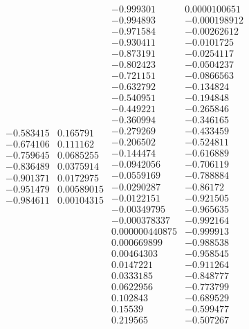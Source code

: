 \documentclass{watsonbook}
\begin{document}
\begin{aexercise}
{$$\begin{array}{cc}
      -0.583415 & 0.165791 \\
      -0.674106 & 0.111162 \\
      -0.759645 & 0.0685255 \\
      -0.836489 & 0.0375914 \\
      -0.901371 & 0.0172975 \\
      -0.951479 & 0.00589015 \\
      -0.984611 & 0.00104315 
    \end{array}
    \begin{array}{cc}
      -0.999301 & 0.0000100651 \\
      -0.994893 & -0.000198912 \\
      -0.971584 & -0.00262612 \\
      -0.930411 & -0.0101725 \\
      -0.873191 & -0.0254117 \\
      -0.802423 & -0.0504237 \\
      -0.721151 & -0.0866563 \\
      -0.632792 & -0.134824 \\
      -0.540951 & -0.194848 \\
      -0.449221 & -0.265846 \\
      -0.360994 & -0.346165 \\
      -0.279269 & -0.433459 \\
      -0.206502 & -0.524811 \\
      -0.144474 & -0.616889 \\
      -0.0942056 & -0.706119 \\
      -0.0559169 & -0.788884 \\
      -0.0290287 & -0.86172 \\
      -0.0122151 & -0.921505 \\
      -0.00349795 & -0.965635 \\
      -0.000378337 & -0.992164 \\
      0.000000440875 & -0.999913 \\
      0.000669899 & -0.988538 \\
      0.00464303 & -0.958545 \\
      0.0147221 & -0.911264 \\
      0.0333185 & -0.848777 \\
      0.0622956 & -0.773799 \\
      0.102843 & -0.689529 \\
      0.15539 & -0.599477 \\
      0.219565 & -0.507267 \\

\end{array}$$}
\end{aexercise}
\end{document}
